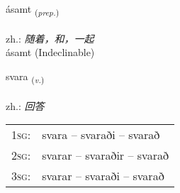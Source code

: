 \documentclass[frontgrid, backgrid]{flacards}\usepackage[]{graphicx}\usepackage[]{xcolor}
\begin{document}

\renewcommand{\flhead}{\vskip5pt \fboxsep=0pt {\small\bfseries\footnotesize Forsetning | 介词}}
\renewcommand{\fcfoot}{\vskip5pt \fboxsep=0pt \hspace{2pt}{\small\bfseries\footnotesize 1K}}

\renewcommand{\blhead}{\vskip5pt {\small\bfseries\footnotesize Forsetning | 介词 }}
\renewcommand{\bcfoot}{\vskip5pt \hspace{2pt}{\small\bfseries\footnotesize 1K}}


{ásamt \small{\textsubscript{(\textit{prep.})}} \\[1ex]
\textphonetic{[auːsam̥t]} \\
zh.: \emph{随着，和，一起} \\  [2ex]
ásamt (Indeclinable)}

\renewcommand{\flhead}{\vskip5pt \fboxsep=0pt {\small\bfseries\footnotesize Sagnorð | 动词}}
\renewcommand{\fcfoot}{\vskip5pt \fboxsep=0pt \hspace{2pt}{\small\bfseries\footnotesize 1K}}

\renewcommand{\blhead}{\vskip5pt {\small\bfseries\footnotesize Sagnorð | 动词 }}
\renewcommand{\bcfoot}{\vskip5pt \hspace{2pt}{\small\bfseries\footnotesize 1K}}


{svara \small{\textsubscript{(\textit{v.})}} \\[1ex] %
\textphonetic{[svaːra]} \\
zh.: \emph{回答} \\  [2ex]
\renewcommand*{\arraystretch}{0.8}
\begin{tabular}{p{1cm}l}
\textsc{1sg}: & svara -- svaraði -- svarað \\ 
\textsc{2sg}: & svarar -- svaraðir -- svarað \\ 
\textsc{3sg}: & svarar -- svaraði -- svarað \\ 
\end{tabular}
}

\renewcommand{\flhead}{\vskip5pt \fboxsep=0pt {\small\bfseries\footnotesize Nafnorð | 名词}}
\renewcommand{\fcfoot}{\vskip5pt \fboxsep=0pt \hspace{2pt}{\small\bfseries\footnotesize 1K}}
\end{document}
